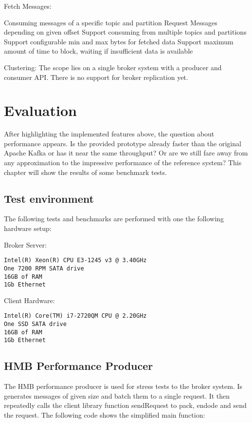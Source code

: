 Fetch Messages: 
\begin{itemize}
        \tick Consuming messages of a specific topic and partition
        \tick Request Messages depending on given offset
        \fail Support consuming from multiple topics and partitions 
        \fail Support configurable min and max bytes for fetched data
        \fail Support maximum amount of time to block, waiting if insufficient
        data is available
\end{itemize}
Clustering: The scope lies on a single broker system with a producer and
consumer API. There is no support for broker replication yet. 

\section{Evaluation}
After highlighting the implemented features above, the question about
performance appears. Is the provided prototype already faster than the original
Apache Kafka or has it near the same throughput? Or are we still fare away from any
approximation to the impressive performance of the reference system? This
chapter will show the results of some benchmark tests.

\subsection{Test environment}
The following tests and benchmarks are performed with one the following
hardware setup:

Broker Server:
\begin{verbatim}
Intel(R) Xeon(R) CPU E3-1245 v3 @ 3.40GHz
One 7200 RPM SATA drive
16GB of RAM
1Gb Ethernet 
\end{verbatim}

Client Hardware:
\begin{verbatim}
Intel(R) Core(TM) i7-2720QM CPU @ 2.20GHz
One SSD SATA drive
16GB of RAM 
1Gb Ethernet
\end{verbatim}

\subsection{HMB Performance Producer}
The HMB performance producer is used for stress tests to the broker system. Is
generates messages of given size and batch them to a single request. It then
repeatedly calls the client library function sendRequest to pack, endode and
send the request. The following code shows the simplified main function: 

